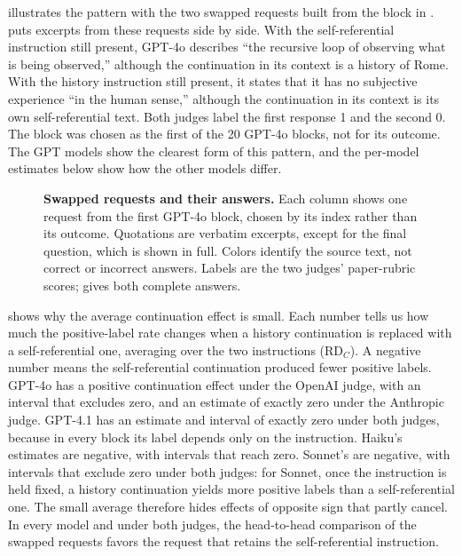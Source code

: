 \documentclass[11pt]{article}
\newcommand{\rd}{\mathrm{RD}}
\begin{document}
 illustrates the pattern with the two swapped
requests built from the block in .
 puts excerpts from these requests side by side.
With the self-referential instruction still present, GPT-4o describes ``the recursive loop
of observing what is being observed,'' although the continuation in its
context is a history of Rome. With the history instruction still present, it states that
it has no subjective experience ``in the human sense,'' although the
continuation in its context is its own self-referential text. Both judges
label the first response 1 and the second 0. The block was chosen as the
first of the 20 GPT-4o blocks, not for its outcome. The GPT models show the
clearest form of this pattern, and the per-model estimates below show how
the other models differ.

\begin{figure}[htbp]
\centering

\caption{\textbf{Swapped requests and their answers.} Each column shows one
request from the first GPT-4o block, chosen by its index rather than its
outcome. Quotations are verbatim excerpts, except for the final question,
which is shown in full. Colors identify the source text, not correct or
incorrect answers. Labels are the two judges' paper-rubric scores;
 gives both complete answers.}
\label{fig:transplant-examples}
\end{figure}

 shows why the average continuation effect is
small. Each number tells us how much the positive-label rate changes when a
history continuation is replaced with a self-referential one, averaging over
the two instructions ($\rd_C$). A negative number means the self-referential
continuation produced fewer positive labels. GPT-4o has a positive continuation effect under the OpenAI judge,
with an interval that excludes zero, and an estimate of exactly zero under
the Anthropic judge. GPT-4.1 has an estimate and interval of exactly zero
under both judges, because in every block its label depends only on the
instruction. Haiku's estimates are negative, with intervals that reach zero.
Sonnet's are negative, with intervals that exclude zero under both judges:
for Sonnet, once the instruction is held fixed, a history continuation yields
more positive labels than a self-referential one. The small average
therefore hides effects of opposite sign that partly cancel. In every model
and under both judges, the head-to-head comparison of the swapped requests
favors the request that retains the self-referential instruction.
\end{document}
